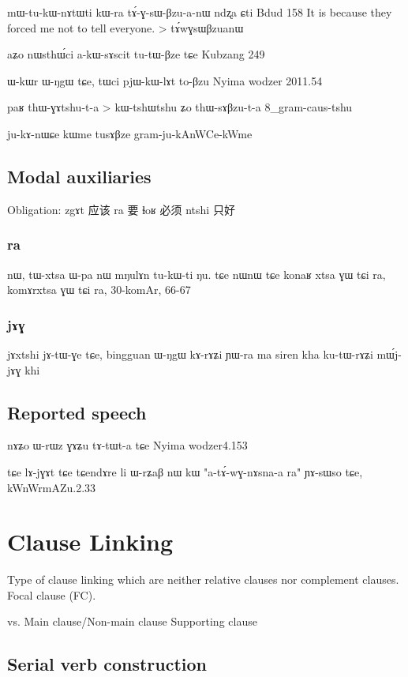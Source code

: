 \documentclass[oldfontcommands,oneside,a4paper,11pt]{memoir}
\newcommand{\wav}[1]{}%
\begin{document}
mɯ-tu-kɯ-nɤtɯti	kɯ-ra	tɤ́-ɣ-sɯ-βzu-a-nɯ	ndʐa	ɕti
Bdud 158 
It is because they forced me not to tell everyone. > tɤ́wɣsɯβzuanɯ


aʑo	nɯsthɯ́ci	a-kɯ-sɤscit	tu-tɯ-βze	tɕe
Kubzang 249

ɯ-kɯr ɯ-ŋgɯ tɕe, tɯci pjɯ-kɯ-lɤt to-βzu
Nyima wodzer 2011.54


paʁ thɯ-ɣɤtshu-t-a > kɯ-tshɯtshu ʑo thɯ-sɤβzu-t-a
8_gram-caus-tshu

ju-kɤ-nɯɕe kɯme tusɤβze
gram-ju-kAnWCe-kWme

\section{Modal auxiliaries}
Obligation: zgɤt 应该 ra 要 ɬoʁ 必须 ntshi 只好

\subsection{ra}

 nɯ, tɯ-xtsa ɯ-pa nɯ mŋulɤn tu-kɯ-ti ŋu.
tɕe nɯnɯ tɕe konaʁ xtsa ɣɯ tɕi ra, 
komɤrxtsa ɣɯ tɕi ra,
30-komAr, 66-67

\subsection{jɤɣ}

jɤxtshi jɤ-tɯ-ɣe tɕe, bingguan ɯ-ŋgɯ kɤ-rɤʑi ɲɯ-ra ma siren kha ku-tɯ-rɤʑi mɯ́j-jɤɣ khi
\wav{mWjjAG}
\section{Reported speech}
nɤʑo ɯ-rɯz ɣɤʑu tɤ-tɯt-a tɕe
Nyima wodzer4.153


tɕe lɤ-jɣɤt tɕe tɕendɤre li ɯ-rʑaβ nɯ kɯ  "a-tɤ́-wɣ-nɤsna-a ra" ɲɤ-sɯso tɕe,
kWnWrmAZu.2.33

\chapter{Clause Linking}

Type of clause linking which are neither relative clauses nor complement clauses.
Focal clause (FC).

vs. Main clause/Non-main clause
 Supporting clause
\section{Serial verb construction} \label{sec:serial.verb}
\end{document}
